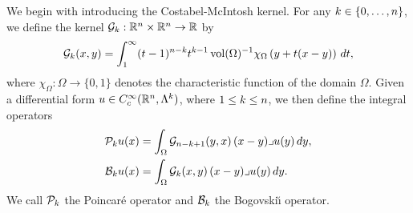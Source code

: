 \documentclass[10pt,a4paper]{article}
\begin{document}
We begin with introducing the Costabel-McIntosh kernel.
For any $k \in \{0,\dotsc,n\}$, we define the kernel ${\mathcal G}_{k} : {\mathbb R}^{n} \times {\mathbb R}^{n} \rightarrow {\mathbb R}$ by
\begin{equation}\label{math:mainkernel}
  {\mathcal G}_{k}(x,y) = \int_{1}^\infty (t-1)^{n-k}t^{k-1} \operatorname{vol}(\Omega)^{-1}\chi_{\Omega} \left(y+t(x-y)\right)\,dt
  ,
\end{equation}
where $\chi_{\Omega} : \Omega \rightarrow \{0,1\}$ denotes the characteristic function of the domain $\Omega$.
Given a differential form $u \in {C^\infty_c}({\mathbb R}^n,\Lambda^k)$, where \(1 \leq k \leq n\), 
we then define the integral operators
\begin{align*}
  {\mathcal P}_{k} u(x) &= \int_{\Omega} {\mathcal G}_{n-k+1}(y,x) \,(x-y)\lrcorner u(y)\,dy,
  \\
  {\mathcal B}_{k} u(x) &= \int_{\Omega} {\mathcal G}_{k}(x,y) \,(x-y)\lrcorner u(y)\,dy.
\end{align*}
We call ${\mathcal P}_{k}$ the Poincar\'e operator and ${\mathcal B}_{k}$ the Bogovski\u{\i} operator. 
\end{document}
